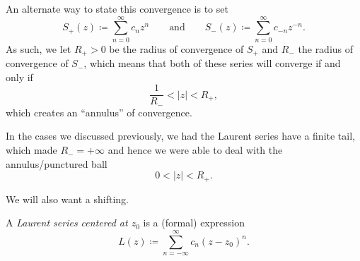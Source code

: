 \documentclass[../notes.tex]{subfiles}
\begin{document}
An alternate way to state this convergence is to set
\[S_+(z)\coloneqq\sum_{n=0}^\infty c_nz^n\qquad\text{and}\qquad S_-(z)\coloneqq\sum_{n=0}^\infty c_{-n}z^{-n}.\]
As such, we let $R_+>0$ be the radius of convergence of $S_+$ and $R_-$ the radius of convergence of $S_-$, which means that both of these series will converge if and only if
\[\frac1{R_-}<|z|<R_+,\]
which creates an ``annulus'' of convergence.
\begin{remark}
	In the cases we discussed previously, we had the Laurent series have a finite tail, which made $R_-=+\infty$ and hence we were able to deal with the annulus/punctured ball
	\[0<|z|<R_+.\]
\end{remark}
We will also want a shifting.
\begin{defihelper}
	A \textit{Laurent series centered at $z_0$} is a (formal) expression
	\[L(z)\coloneqq\sum_{n=-\infty}^\infty c_n(z-z_0)^n.\]
\end{defihelper}
\end{document}
